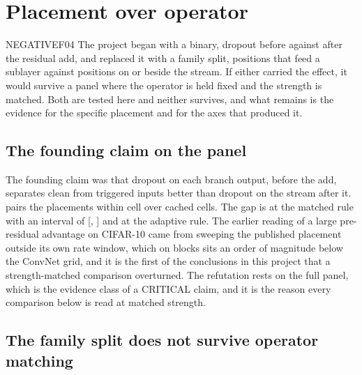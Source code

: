 \documentclass[../main.tex]{subfiles}
\begin{document}
\section{Placement over operator}
\label{sec:placement}

\begin{claim}{NEGATIVE}{F04}
The project began with a binary, dropout before against after the residual add, and replaced it with a family split, positions that feed a sublayer against positions on or beside the stream. If either carried the effect, it would survive a panel where the operator is held fixed and the strength is matched. Both are tested here and neither survives, and what remains is the evidence for the specific placement and for the axes that produced it.
\end{claim}

\subsection{The founding claim on the panel}

The founding claim was that dropout on each branch output, before the add, separates clean from triggered inputs better than dropout on the stream after it.  pairs the placements within cell over \PreMinusPostN{} cached cells. The gap is \PreMinusPostMatched{} at the matched rule with an interval of [\PreMinusPostMatchedLow{}, \PreMinusPostMatchedHigh{}] and \PreMinusPostAdaptive{} at the adaptive rule. The earlier reading of a large pre-residual advantage on CIFAR-10 came from sweeping the published placement outside its own rate window, which on \VitBlocks{} blocks sits an order of magnitude below the ConvNet grid, and it is the first of the conclusions in this project that a strength-matched comparison overturned. The refutation rests on the full panel, which is the evidence class of a CRITICAL claim, and it is the reason every comparison below is read at matched strength.



\subsection{The family split does not survive operator matching}
\end{document}
